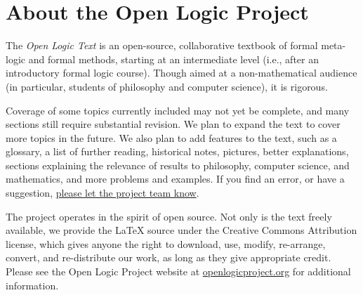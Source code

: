 \chapter*{About the Open Logic Project}


The \textit{Open Logic Text} is an open-source, collaborative textbook
of formal meta-logic and formal methods, starting at an intermediate level
(i.e., after an introductory formal logic course). Though aimed at a
non-mathematical audience (in particular, students of philosophy and
computer science), it is rigorous.

Coverage of some topics currently included may
not yet be complete, and many sections still require substantial
revision. We plan to expand the text to cover more topics in
the future. We also plan to add features to the text, such as a
glossary, a list of further reading, historical notes, pictures, better
explanations, sections explaining the relevance of results to
philosophy, computer science, and mathematics, and more problems and
examples. If you find an error, or have a suggestion,
\href{https://github.com/OpenLogicProject/OpenLogic/wiki/Contributing}{please let the project team know}.

The project operates in the spirit of open source. Not only is the
text freely available, we provide the LaTeX source under the
Creative Commons Attribution license, which gives anyone the right to
download, use, modify, re-arrange, convert, and re-distribute our
work, as long as they give appropriate credit.
Please see the Open Logic Project website at
\href{http://openlogicproject.org/}{openlogicproject.org} for
additional information.
